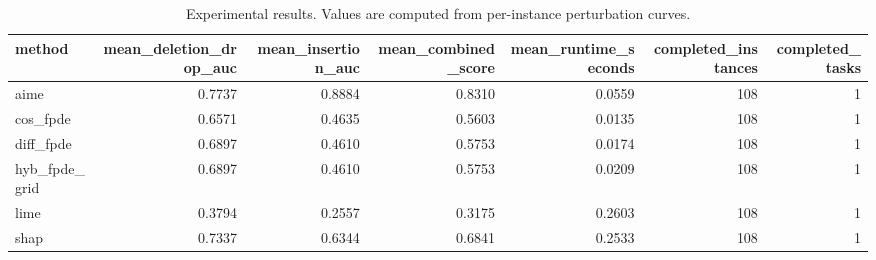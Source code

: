 \begin{table}[t]
\caption{Experimental results. Values are computed from per-instance perturbation curves.}
\label{tab:main_results_computed}
\centering
\begin{tabular}{lrrrrrr}
\toprule
method & mean\_deletion\_drop\_auc & mean\_insertion\_auc & mean\_combined\_score & mean\_runtime\_seconds & completed\_instances & completed\_tasks \\
\midrule
aime & 0.7737 & 0.8884 & 0.8310 & 0.0559 & 108 & 1 \\
cos\_fpde & 0.6571 & 0.4635 & 0.5603 & 0.0135 & 108 & 1 \\
diff\_fpde & 0.6897 & 0.4610 & 0.5753 & 0.0174 & 108 & 1 \\
hyb\_fpde\_grid & 0.6897 & 0.4610 & 0.5753 & 0.0209 & 108 & 1 \\
lime & 0.3794 & 0.2557 & 0.3175 & 0.2603 & 108 & 1 \\
shap & 0.7337 & 0.6344 & 0.6841 & 0.2533 & 108 & 1 \\
\bottomrule
\end{tabular}

\end{table}
